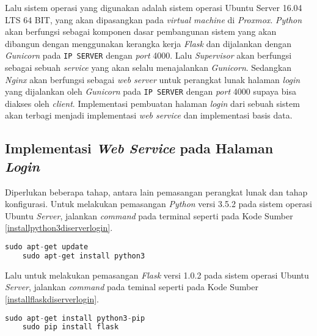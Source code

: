   Lalu sistem operasi yang digunakan adalah sistem operasi Ubuntu Server 16.04 LTS 64 BIT, yang akan dipasangkan pada \textit{virtual machine} di \textit{Proxmox}. \textit{Python} akan berfungsi sebagai komponen dasar pembangunan sistem yang akan dibangun dengan menggunakan kerangka kerja \textit{Flask} dan dijalankan dengan \textit{Gunicorn} pada \texttt{IP SERVER} dengan \textit{port} 4000. Lalu \textit{Supervisor} akan berfungsi sebagai sebuah \textit{service} yang akan selalu menajalankan \textit{Gunicorn}. Sedangkan \textit{Nginx} akan berfungsi sebagai \textit{web server} untuk perangkat lunak halaman \textit{login} yang dijalankan oleh \textit{Gunicorn} pada \texttt{IP SERVER} dengan \textit{port} 4000 supaya bisa diakses oleh \textit{client}. Implementasi pembuatan halaman \textit{login} dari sebuah sistem akan terbagi menjadi implementasi \textit{web service} dan implementasi basis data.
  
  \subsection{Implementasi \textit{Web Service} pada Halaman \textit{Login}}
  Diperlukan beberapa tahap, antara lain pemasangan perangkat lunak dan tahap konfigurasi. Untuk melakukan pemasangan \textit{Python} versi 3.5.2 pada sistem operasi Ubuntu \textit{Server}, jalankan \textit{command} pada terminal seperti pada Kode Sumber \ref{installpython3diserverlogin}.\\
  \begin{minipage}{\linewidth}
	\begin{lstlisting}[caption=Command untuk installasi Python,language=Python,label=installpython3diserverlogin]
	sudo apt-get update
	sudo apt-get install python3
	\end{lstlisting}
  \end{minipage}
  
  Lalu untuk melakukan pemasangan \textit{Flask} versi 1.0.2 pada sistem operasi Ubuntu \textit{Server}, jalankan \textit{command} pada teminal seperti pada Kode Sumber \ref{installflaskdiserverlogin}.\\  
  \begin{minipage}{\linewidth}
	\begin{lstlisting}[caption=Command untuk installasi Flask,language=Python,label=installflaskdiserverlogin]
	sudo apt-get install python3-pip
	sudo pip install flask
	\end{lstlisting}
  \end{minipage}
  

